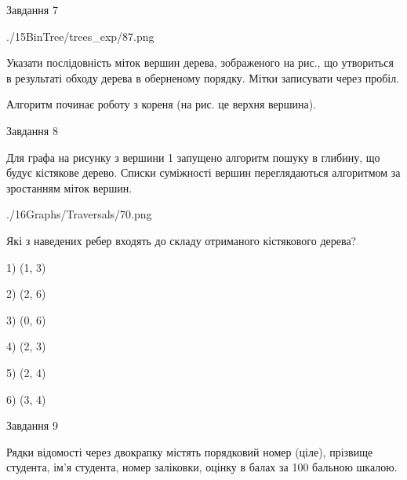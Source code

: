 \documentclass[12pt, ukrainian]{article}
\begin{document}
{\vspace{10mm}\par

\newpage
\begin{minipage}[t]{9.7cm}
               
{\begin{center}Завдання {7}\end{center}}
\vspace{-6mm}

\begin{center}
	{./15BinTree/trees_exp/87.png}
\end{center}
Указати послідовність міток вершин дерева, зображеного на рис., що утвориться в результаті обходу дерева в оберненому порядку. Мітки записувати через пробіл.\par Алгоритм починає роботу з кореня (на рис. це верхня вершина).\par

\end{minipage}
\vline \hspace{8mm}
\begin{minipage}[t]{8.0cm}
               
{\begin{center}Завдання {8}\end{center}}
\vspace{-6mm}
Для графа на рисунку з вершини 1 запущено алгоритм пошуку в глибину, що будує кістякове дерево. Списки суміжності вершин переглядаються алгоритмом за зростанням міток вершин.\par
\begin{center}
	{./16Graphs/Traversals/70.png}
\end{center}
\par Які з наведених ребер входять до складу отриманого кістякового дерева?\par
1) (1, 3)\par
2) (2, 6)\par
3) (0, 6)\par
4) (2, 3)\par
5) (2, 4)\par
6) (3, 4)\par
{\vskip 15pt} \par

\end{minipage}

               
{\begin{center}Завдання {9}\end{center}}
\vspace{-6mm}
Рядки відомості через двокрапку містять порядковий номер (ціле), пріз\-ви\-ще студен\-та, ім'я студента, номер заліковки, оцінку в балах за 100 бальною шкалою.

}
\end{document}
